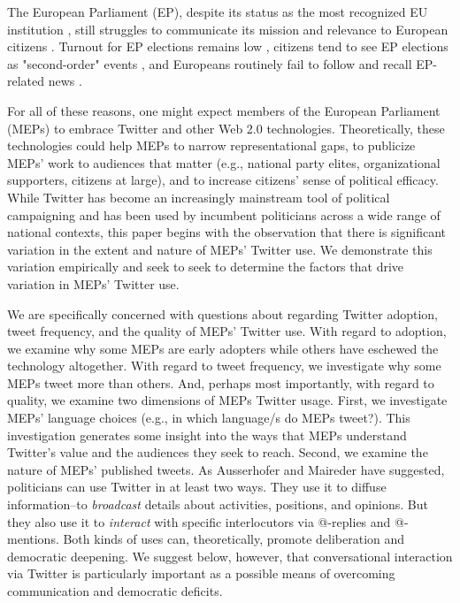 \documentclass{article}\usepackage[]{graphicx}\usepackage[]{color}
\begin{document}
	The European Parliament (EP), despite its status as the most recognized EU institution \cite[e.g.,]{eurobarometer.2014}, still struggles to communicate its mission and relevance to European citizens \citep*{anderson.mcleod.2004}. Turnout for EP elections remains low \citep*{hobolt.2014, franklin.hobolt.2011, mattila.2013}, citizens tend to see EP elections as "second-order" events \citep*{hix.marsh.2007, schmitt.2005}, and Europeans routinely fail to follow and recall EP-related news \citep*{eurobarometer.2013}. 
	
	For all of these reasons, one might expect members of the European Parliament (MEPs) to embrace Twitter and other Web 2.0 technologies. Theoretically, these technologies could help MEPs to narrow representational gaps, to publicize MEPs' work to audiences that matter (e.g., national party elites, organizational supporters, citizens at large), and to increase citizens' sense of political efficacy. While Twitter has become an increasingly mainstream tool of political campaigning and has been used by incumbent politicians across a wide range of national contexts, this paper begins with the observation that there is significant variation in the extent and nature of MEPs' Twitter use. We demonstrate this variation empirically and seek to seek to determine the factors that drive variation in MEPs' Twitter use.
	
	We are specifically concerned with questions about regarding Twitter adoption, tweet frequency, and the quality of MEPs' Twitter use. With regard to adoption, we examine why some MEPs are early adopters while others have eschewed the technology altogether.  With regard to tweet frequency, we investigate why some MEPs tweet more than others.  And, perhaps most importantly, with regard to quality, we examine two dimensions of MEPs Twitter usage. First, we investigate MEPs' language choices (e.g., in which language/s do MEPs tweet?). This investigation generates some insight into the ways that MEPs understand Twitter's value and the audiences they seek to reach. Second, we examine the nature of MEPs' published tweets.  As Ausserhofer and Maireder  have suggested, politicians can use Twitter in at least two ways. They use it to diffuse information--to \emph{broadcast} details about activities, positions, and opinions. But they also use it to \emph{interact} with specific interlocutors via @-replies and @-mentions. Both kinds of uses can, theoretically, promote deliberation and democratic deepening. We suggest below, however, that conversational interaction via Twitter is particularly important as a possible means of overcoming communication and democratic deficits.
	
\end{document}
